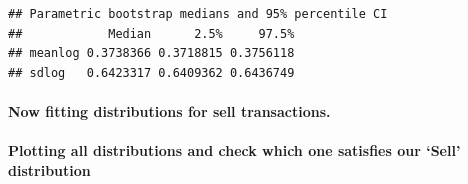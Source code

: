 \documentclass[]{article}
\newenvironment{Shaded}{\begin{snugshade}}{\end{snugshade}}
\newcommand{\KeywordTok}[1]{\textcolor[rgb]{0.13,0.29,0.53}{\textbf{#1}}}
\newcommand{\StringTok}[1]{\textcolor[rgb]{0.31,0.60,0.02}{#1}}
\newcommand{\OperatorTok}[1]{\textcolor[rgb]{0.81,0.36,0.00}{\textbf{#1}}}
\newcommand{\NormalTok}[1]{#1}
\let\oldparagraph\paragraph
\renewcommand{\paragraph}[1]{\oldparagraph{#1}\mbox{}}
\begin{document}
\begin{verbatim}
## Parametric bootstrap medians and 95% percentile CI 
##            Median      2.5%     97.5%
## meanlog 0.3738366 0.3718815 0.3756118
## sdlog   0.6423317 0.6409362 0.6436749
\end{verbatim}

\paragraph{Now fitting distributions for sell
transactions.}\label{now-fitting-distributions-for-sell-transactions.-1}

\begin{Shaded}
\end{Shaded}

\paragraph{\texorpdfstring{Plotting all distributions and check which
one satisfies our `Sell'
distribution}{Plotting all distributions and check which one satisfies our Sell distribution}}\label{plotting-all-distributions-and-check-which-one-satisfies-our-sell-distribution-2}
\end{document}
